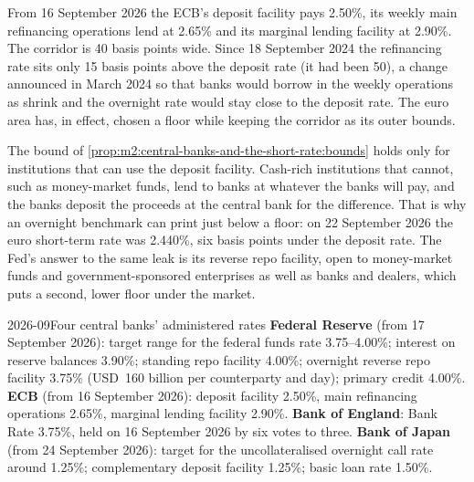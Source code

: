 \begin{example}\label{ex:m2:central-banks-and-the-short-rate:ecb}
From 16 September 2026 the ECB's deposit facility pays 2.50\%, its weekly
main refinancing operations lend at 2.65\% and its marginal lending facility
at 2.90\%. The corridor is 40 basis points wide. Since 18 September 2024 the
refinancing rate sits only 15 basis points above the deposit rate (it had
been 50), a change announced in March 2024 so that banks would borrow in the
weekly operations as  shrink and the overnight rate would stay close
to the deposit rate. The euro area has, in effect, chosen a floor while
keeping the corridor as its outer bounds.
\end{example}

\begin{remark}\label{rem:m2:central-banks-and-the-short-rate:below}
The bound of \cref{prop:m2:central-banks-and-the-short-rate:bounds} holds only
for institutions that can use the deposit facility. Cash-rich institutions
that cannot, such as money-market funds, lend to banks at whatever the banks
will pay, and the banks deposit the proceeds at the central bank for the
difference. That is why an overnight benchmark can print just below a floor:
on 22 September 2026 the euro short-term rate was 2.440\%, six basis points
under the deposit rate. The Fed's answer to the same leak is its reverse repo
facility, open to money-market funds and government-sponsored enterprises as
well as banks and dealers, which puts a second, lower floor under the market.
\end{remark}

\begin{dated}{2026-09}{Four central banks' administered rates}\label{dat:m2:central-banks-and-the-short-rate:rates}
\textbf{Federal Reserve} (from 17 September 2026): target range for the
federal funds rate 3.75--4.00\%; interest on reserve balances 3.90\%;
standing repo facility 4.00\%; overnight reverse repo facility 3.75\% (USD~160
billion per counterparty and day); primary credit 4.00\%.
\textbf{ECB} (from 16 September 2026): deposit facility 2.50\%, main
refinancing operations 2.65\%, marginal lending facility 2.90\%.
\textbf{Bank of England}: Bank Rate 3.75\%, held on 16 September 2026 by six
votes to three. \textbf{Bank of Japan} (from 24 September 2026): target for
the uncollateralised overnight call rate around 1.25\%; complementary
deposit facility 1.25\%; basic loan rate 1.50\%.
\end{dated}

